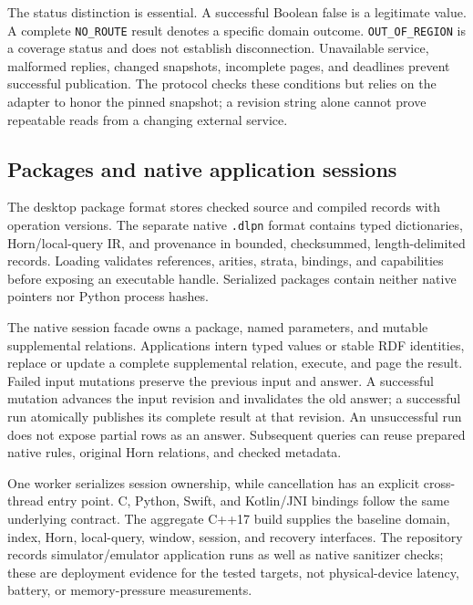 \documentclass{article}
\newcommand{\code}[1]{\texttt{#1}}
\begin{document}
The status distinction is essential. A successful Boolean false is a legitimate
value. A complete \code{NO\_ROUTE} result denotes a specific domain outcome.
\code{OUT\_OF\_REGION} is a coverage status and does not establish disconnection.
Unavailable service, malformed replies, changed snapshots, incomplete pages,
and deadlines prevent successful publication. The protocol checks these
conditions but relies on the adapter to honor the pinned snapshot; a revision
string alone cannot prove repeatable reads from a changing external service.

\subsection{Packages and native application sessions}
The desktop package format stores checked source and compiled records with
operation versions. The separate native \code{.dlpn} format contains typed
dictionaries, Horn/local-query IR, and provenance in bounded, checksummed,
length-delimited records. Loading validates references, arities, strata,
bindings, and capabilities before exposing an executable handle. Serialized
packages contain neither native pointers nor Python process hashes.

The native session facade owns a package, named parameters, and mutable
supplemental relations. Applications intern typed values or stable RDF identities,
replace or update a complete supplemental relation, execute, and page the result.
Failed input mutations preserve the previous input and answer. A successful
mutation advances the input revision and invalidates the old answer; a successful
run atomically publishes its complete result at that revision. An unsuccessful
run does not expose partial rows as an answer. Subsequent queries can reuse
prepared native rules, original Horn relations, and checked metadata.

One worker serializes session ownership, while cancellation has an explicit
cross-thread entry point. C, Python, Swift, and Kotlin/JNI bindings follow the
same underlying contract. The aggregate C++17 build supplies the baseline domain,
index, Horn, local-query, window, session, and recovery interfaces. The repository
records simulator/emulator application runs as well as native sanitizer checks;
these are deployment evidence for the tested targets, not physical-device
latency, battery, or memory-pressure measurements.
\end{document}
